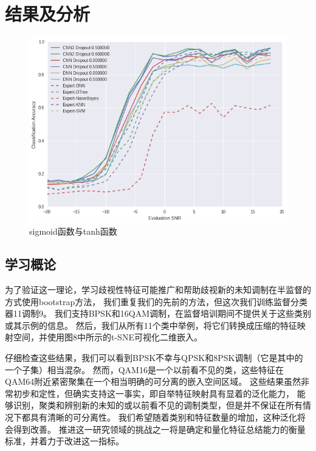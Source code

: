 \section{结果及分析}

\begin{figure}[!h]
	\centering
	\includegraphics[scale=0.3]{figures/chapter_3/result}
	\caption{sigmoid函数与tanh函数}\label{fig_2_2}
\end{figure}

\subsection{学习概论}
为了验证这一理论，学习歧视性特征可能推广和帮助歧视新的未知调制在半监督的方式使用bootstrap方法，
我们重复我们的先前的方法，但这次我们训练监督分类器11调制9。
我们支持BPSK和16QAM调制，在监督培训期间不提供关于这些类别或其示例的信息。
然后，我们从所有11个类中举例，将它们转换成压缩的特征映射空间，并使用图8中所示的t-SNE可视化二维嵌入。\par

仔细检查这些结果，我们可以看到BPSK不幸与QPSK和8PSK调制（它是其中的一个子集）相当混杂。
然而，QAM16是一个以前看不见的类，这些特征在QAM64附近紧密聚集在一个相当明确的可分离的嵌入空间区域。
这些结果虽然非常初步和定性，但确实支持这一事实，即自举特征映射具有显着的泛化能力，
能够识别，聚类和辨别新的未知的或以前看不见的调制类型，但是并不保证在所有情况下都具有清晰的可分离性。
我们希望随着类别和特征数量的增加，这种泛化将会得到改善。
推进这一研究领域的挑战之一将是确定和量化特征总结能力的衡量标准，并着力于改进这一指标。\par

